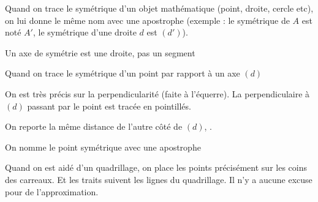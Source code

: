 \documentclass{exam}
\begin{document}
\begin{Indication}

\begin{compactitem}
  \item Quand on trace le symétrique d'un objet mathématique (point, droite, cercle etc), on lui donne le même nom avec une apostrophe (exemple : le symétrique de $A$ est noté $A'$, le symétrique d'une droite $d$ est $(d')$).
  \item Un axe de symétrie est une droite, pas un segment
  \item Quand on trace le symétrique d'un point par rapport à un axe $(d)$
\begin{compactitem}

    \item On est très précis sur la perpendicularité (faite à l'équerre). La perpendiculaire à $(d)$ passant par le point est tracée en pointillés.
    \item On reporte la même distance de l'autre côté de $(d)$, .
    \item On nomme le point symétrique avec une apostrophe
\end{compactitem}
\item Quand on est aidé d'un quadrillage, on place les points précisément sur les coins des carreaux. Et les traits suivent les lignes du quadrillage. Il n'y a aucune excuse pour de l'approximation.
\end{compactitem}

\end{Indication}
\end{document}
